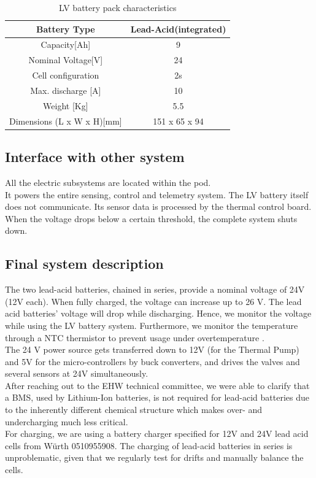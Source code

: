 \begin{table}[h]
    \centering
    \begin{adjustbox}{width=\textwidth,center}
    \begin{tabular}{|c|c|}
       \hline
       Battery Type & Lead-Acid(integrated)\\
       \hline
       Capacity[Ah] & 9 \\
       \hline
       Nominal Voltage[V] & 24 \\
       \hline
       Cell configuration & 2s \\
       \hline
       Max. discharge [A] & 10 \\
       \hline
       Weight [Kg] & 5.5 \\
       \hline 
       Dimensions (L x W x H)[mm] & 151 x 65 x 94 \\
       \hline 
    \end{tabular}
    \end{adjustbox}
    \label{Low Voltage Battery Specs}
    \caption{LV battery pack characteristics}
\end{table}    

\subsection{Interface with other system}
All the electric subsystems are located within the pod. \\
It powers the entire sensing, control and telemetry system. 
The LV battery itself does not communicate. Its sensor data is processed by the thermal control board.
When the voltage drops below a certain threshold, the complete system shuts down.

\subsection{Final system description}
The two lead-acid batteries, chained in series, provide a nominal voltage of 24V (12V each). When fully charged, the voltage can increase up to 26 V. The lead acid batteries' voltage will drop while discharging. Hence, we monitor the voltage while using the LV battery system. Furthermore, we monitor the temperature through a NTC thermistor to prevent usage under overtemperature . \\
The 24 V power source gets transferred down to 12V (for the Thermal Pump) and 5V for the micro-controllers by buck converters, and drives the valves and several sensors at 24V simultaneously. \\
After reaching out to the EHW technical committee, we were able to clarify that a BMS, used by Lithium-Ion batteries, is not required for lead-acid batteries due to the inherently different chemical structure which makes over- and undercharging much less critical. \\
For charging, we are using a battery charger specified for 12V and 24V lead acid cells from Würth 0510955908. The charging of lead-acid batteries in series is unproblematic, given that we regularly test for drifts and manually balance the cells.\\


